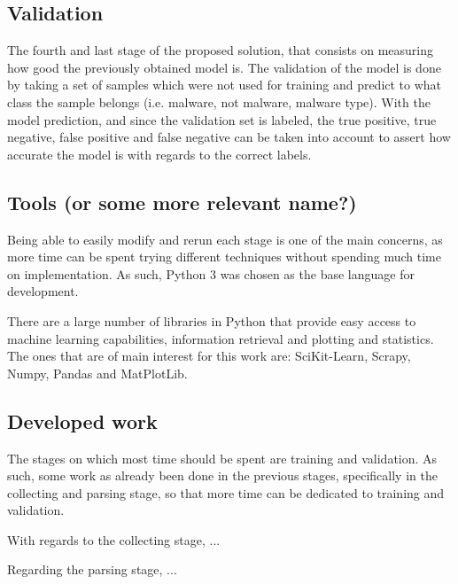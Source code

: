 \documentclass{llncs}
\begin{document}
\subsection{Validation}
The fourth and last stage of the proposed solution, that consists on measuring how good the previously obtained model is. The validation of the model is done by taking a set of samples which were not used for training and predict to what class the sample belongs (i.e. malware, not malware, malware type). With the model prediction, and since the validation set is labeled, the true positive, true negative, false positive and false negative can be taken into account to assert how accurate the model is with regards to the correct labels.


\subsection{Tools (or some more relevant name?)}
Being able to easily modify and rerun each stage is one of the main concerns, as more time can be spent trying different techniques without spending much time on implementation. As such, Python 3 was chosen as the base language for development.

There are a large number of libraries in Python that provide easy access to machine learning capabilities, information retrieval and plotting and statistics. The ones that are of main interest for this work are: SciKit-Learn, Scrapy, Numpy, Pandas and MatPlotLib.


\subsection{Developed work}
The stages on which most time should be spent are training and validation. As such, some work as already been done in the previous stages, specifically in the collecting and parsing stage, so that more time can be dedicated to training and validation.

With regards to the collecting stage, ...

Regarding the parsing stage, ...

\clearpage
\end{document}
